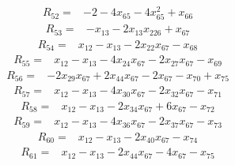 \begin{equation*}\begin{split}
R_{52}={}&-2 - 4x_{65} - 4x_{65}^{2} + x_{66}
\end{split}\end{equation*}
\begin{equation*}\begin{split}
R_{53}={}&-x_{13} - 2x_{13} x_{226} + x_{67}
\end{split}\end{equation*}
\begin{equation*}\begin{split}
R_{54}={}&x_{12} - x_{13} - 2x_{22} x_{67} - x_{68}
\end{split}\end{equation*}
\begin{equation*}\begin{split}
R_{55}={}&x_{12} - x_{13} - 4x_{24} x_{67} - 2x_{27} x_{67} - x_{69}
\end{split}\end{equation*}
\begin{equation*}\begin{split}
R_{56}={}&-2x_{29} x_{67} + 2x_{44} x_{67} - 2x_{67} - x_{70} + x_{75}
\end{split}\end{equation*}
\begin{equation*}\begin{split}
R_{57}={}&x_{12} - x_{13} - 4x_{30} x_{67} - 2x_{32} x_{67} - x_{71}
\end{split}\end{equation*}
\begin{equation*}\begin{split}
R_{58}={}&x_{12} - x_{13} - 2x_{34} x_{67} + 6x_{67} - x_{72}
\end{split}\end{equation*}
\begin{equation*}\begin{split}
R_{59}={}&x_{12} - x_{13} - 4x_{36} x_{67} - 2x_{37} x_{67} - x_{73}
\end{split}\end{equation*}
\begin{equation*}\begin{split}
R_{60}={}&x_{12} - x_{13} - 2x_{40} x_{67} - x_{74}
\end{split}\end{equation*}
\begin{equation*}\begin{split}
R_{61}={}&x_{12} - x_{13} - 2x_{44} x_{67} - 4x_{67} - x_{75}
\end{split}\end{equation*}
